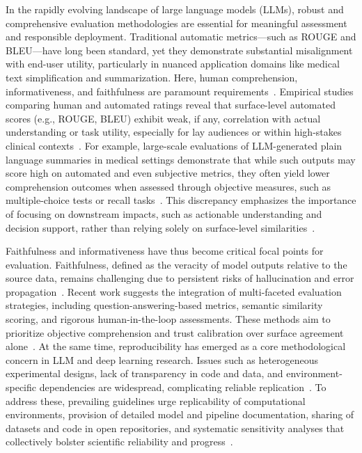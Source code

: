 \documentclass[sigconf]{acmart}
\begin{document}
In the rapidly evolving landscape of large language models (LLMs), robust and comprehensive evaluation methodologies are essential for meaningful assessment and responsible deployment. Traditional automatic metrics—such as ROUGE and BLEU—have long been standard, yet they demonstrate substantial misalignment with end-user utility, particularly in nuanced application domains like medical text simplification and summarization. Here, human comprehension, informativeness, and faithfulness are paramount requirements~\cite{ref76, ref91, ref94, ref106, ref108}. Empirical studies comparing human and automated ratings reveal that surface-level automated scores (e.g., ROUGE, BLEU) exhibit weak, if any, correlation with actual understanding or task utility, especially for lay audiences or within high-stakes clinical contexts~\cite{ref81, ref94, ref95, ref101, ref104, ref108}. For example, large-scale evaluations of LLM-generated plain language summaries in medical settings demonstrate that while such outputs may score high on automated and even subjective metrics, they often yield lower comprehension outcomes when assessed through objective measures, such as multiple-choice tests or recall tasks~\cite{ref81}. This discrepancy emphasizes the importance of focusing on downstream impacts, such as actionable understanding and decision support, rather than relying solely on surface-level similarities~\cite{ref81, ref94}.

Faithfulness and informativeness have thus become critical focal points for evaluation. Faithfulness, defined as the veracity of model outputs relative to the source data, remains challenging due to persistent risks of hallucination and error propagation~\cite{ref91, ref101, ref106, ref108}. Recent work suggests the integration of multi-faceted evaluation strategies, including question-answering-based metrics, semantic similarity scoring, and rigorous human-in-the-loop assessments. These methods aim to prioritize objective comprehension and trust calibration over surface agreement alone~\cite{ref94, ref101, ref104}. At the same time, reproducibility has emerged as a core methodological concern in LLM and deep learning research. Issues such as heterogeneous experimental designs, lack of transparency in code and data, and environment-specific dependencies are widespread, complicating reliable replication~\cite{ref76, ref95, ref106}. To address these, prevailing guidelines urge replicability of computational environments, provision of detailed model and pipeline documentation, sharing of datasets and code in open repositories, and systematic sensitivity analyses that collectively bolster scientific reliability and progress~\cite{ref76, ref106, ref108}.
\end{document}

